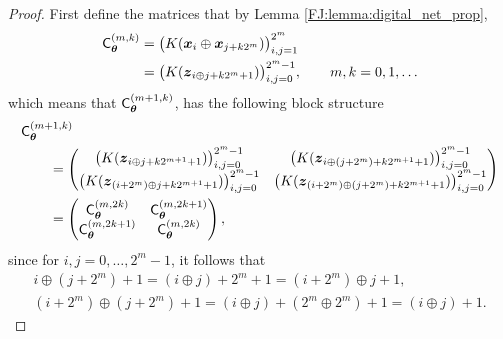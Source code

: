 \documentclass[graybox,footinfo]{svmult}
\begin{document}
\begin{proof}
    First define the matrices that by Lemma \ref{FJ:lemma:digital_net_prop}, 
    \begin{align*}
    \mathsf{C}_{{\boldsymbol{\theta}}}^{(m,k)} & = \bigl(K({\boldsymbol{x}}_i \oplus {\boldsymbol{x}}_{j + k2^m} )\bigr)_{i,j=1}^{2^m} \\
    & = \bigl(K({\boldsymbol{z}}_{i\oplus j+ k 2^m + 1})\bigr)_{i,j=0}^{2^m-1}, \qquad m,k  = 0, 1, \ldots
    \end{align*}
    which means that $\mathsf{C}_{{\boldsymbol{\theta}}}^{(m+1,k)}$, has the following block structure
    \begin{align} \nonumber
    \MoveEqLeft{\mathsf{C}_{\bstheta}^{(m+1,k)}} \\
    \nonumber
    & = 
    \begin{pmatrix} 
    \bigl(K(\bsz_{i\oplus j+ k2^{m+1} + 1})\bigr)_{i,j=0}^{2^m-1} &
    \bigl(K(\bsz_{i\oplus (j+2^m)+ k2^{m+1} +1})\bigr)_{i,j=0}^{2^m-1} \\
    \bigl(K(\bsz_{(i + 2^m) \oplus j + k2^{m+1}+1})\bigr)_{i,j=0}^{2^m-1} &
    \bigl(K(\bsz_{(i + 2^m) \oplus (j+2^m) + k2^{m+1} +1})\bigr)_{i,j=0}^{2^m-1}
    \end{pmatrix} \\
    & = \begin{pmatrix} \mathsf{C}_{\bstheta}^{(m,2k)} & \mathsf{C}_{\bstheta}^{(m,2k+1)} \\
    \mathsf{C}_{\bstheta}^{(m,2k+1)} & \mathsf{C}_{\bstheta}^{(m,2k)}
    \end{pmatrix} , \label{FJ:eq:cblock}
    \end{align}
    since for $i,j = 0, \ldots, 2^m-1$, it follows that 
    \begin{gather*}
        i\oplus (j+2^m) +1 = (i\oplus j) + 2^m +1 = (i + 2^m) \oplus j +1 ,\\
        (i + 2^m) \oplus (j+2^m) +1 = (i\oplus j) + (2^m \oplus 2^m) +1= (i\oplus j) +1.
    \end{gather*}
    

\end{proof}
\end{document}
